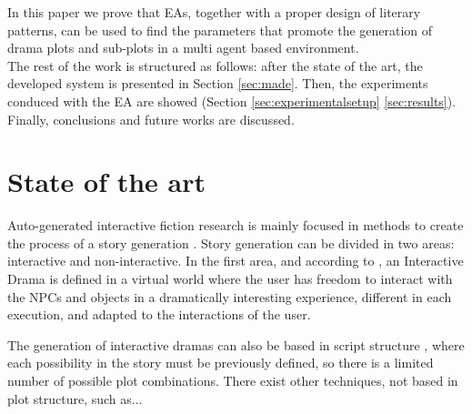 \documentclass[runningheads]{llncs}
\begin{document}

In this paper we prove that EAs, together with a proper design of literary patterns, can be used to find the parameters that promote the generation of drama plots and sub-plots in a multi agent based environment.\\

The rest of the work is structured as follows: after the state of the art, the developed system is presented in Section \ref{sec:made}. Then, the experiments conduced with the EA are showed (Section \ref{sec:experimentalsetup} \ref{sec:results}). Finally, conclusions and future works are discussed.


\section{State of the art}
\label{sec:soa}


Auto-generated interactive fiction research is mainly focused in methods to create the process of a story generation \cite{nairat2011character}. Story generation can be divided in two areas: interactive and non-interactive. In the first area, and according to \cite{ReviewArinbjarnar09}, an Interactive Drama is defined in a virtual world where the user has freedom to interact with the NPCs and objects in a dramatically interesting experience, different in each execution, and adapted to the interactions of the user.



The generation of interactive dramas can also be based in script
structure \cite{ArchitectureYoung04}, where each possibility in the
story must be previously defined, so there is a limited number of
possible plot combinations. There exist other techniques, not based in
plot structure, such as... 

\end{document}
